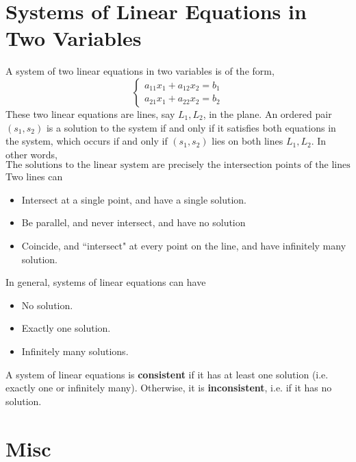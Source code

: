 \documentclass[letterpaper,12pt]{article}
\begin{document}
\section*{Systems of Linear Equations in Two Variables}
A system of two linear equations in two variables is of the form,
\begin{equation*}
    \begin{cases} a_{11} x_1 + a_{12} x_2 = b_1 \\ a_{21} x_1 + a_{22} x_2 = b_2 \end{cases}
\end{equation*}
These two linear equations are lines, say $L_1, L_2$, in the plane. An ordered pair $(s_1, s_2)$ is a solution to the system if and only if it satisfies both equations in the system, which occurs if and only if $(s_1, s_2)$ lies on both lines $L_1, L_2$. In other words,
\begin{equation*}
    \boxed{\text{The solutions to the linear system are precisely the intersection points of the lines}}
\end{equation*}
Two lines can
\begin{itemize}
    \item Intersect at a single point, and have a single solution.
    \item Be parallel, and never intersect, and have no solution
    \item Coincide, and ``intersect" at every point on the line, and have infinitely many solution.
\end{itemize}
In general, systems of linear equations can have
\begin{itemize}
    \item No solution.
    \item Exactly one solution.
    \item Infinitely many solutions.
\end{itemize}

\begin{definition}
A system of linear equations is \textbf{consistent} if it has at least one solution (i.e. exactly one or infinitely many). Otherwise, it is \textbf{inconsistent}, i.e. if it has no solution.
\end{definition}

\section*{Misc}
\end{document}
